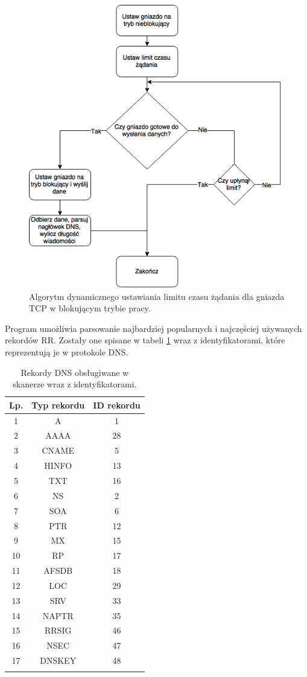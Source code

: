 \begin{figure}[h]
	\centering
	\includegraphics[width=1.0\textwidth]{image/socketAlg}
	\caption{Algorytm dynamicznego ustawiania limitu czasu żądania dla gniazda TCP w blokującym trybie pracy.}
	\label{fig:socketAlg}
\end{figure}

Program umożliwia parsowanie najbardziej popularnych i najczęściej używanych rekordów RR. Zostały one spisane w tabeli \ref{records}
wraz z identyfikatorami, które reprezentują je w protokole DNS.

\begin{longtable}{|c|c|c|}
	\hline
	\textbf{Lp.} &
	\textbf{Typ rekordu} &
	\textbf{ID rekordu} \\ \hline\hline
	1 & A & 1 \\
	2 & AAAA & 28 \\
    3 & CNAME & 5 \\
	4 & HINFO & 13 \\
	5 & TXT & 16 \\
	6 & NS & 2 \\
	7 & SOA & 6 \\
	8 & PTR & 12 \\
	9 & MX & 15 \\
	10 & RP & 17 \\
	11 & AFSDB & 18 \\
	12 & LOC & 29 \\
	13 & SRV & 33 \\
	14 & NAPTR & 35 \\
	15 & RRSIG & 46 \\
	16 & NSEC & 47 \\
	17 & DNSKEY & 48 \\
	\hline
	\caption{Rekordy DNS obsługiwane w skanerze wraz z identyfikatorami.}
	\label{records}
\end{longtable}


